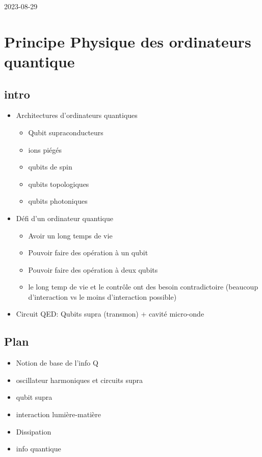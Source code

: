 



2023-08-29

{\section*{Principe Physique des ordinateurs quantique}\centering}


\subsection*{intro}

\begin{itemize}
	\item Architectures d'ordinateurs quantiques
	\begin{itemize}
		\item Qubit supraconducteurs
		\item ions piégés
		\item qubits de spin
		\item qubits topologiques
		\item qubits photoniques
	\end{itemize}
	\item Défi d'un ordinateur quantique
		\begin{itemize}
			\item Avoir un long temps de vie
			\item Pouvoir faire des opération à un qubit
			\item Pouvoir faire des opération à deux qubits
			\item le long temp de vie et le contrôle ont des besoin contradictoire (beaucoup d'interaction vs le moins d'interaction possible)
		\end{itemize}
	\item Circuit QED: Qubits supra (transmon) + cavité micro-onde
\end{itemize}

\subsection*{Plan}
\begin{itemize}
	\item Notion de base de l'info Q
	\item oscillateur harmoniques et circuits supra
	\item qubit supra
	\item interaction lumière-matière
	\item Dissipation
	\item info quantique
\end{itemize}

